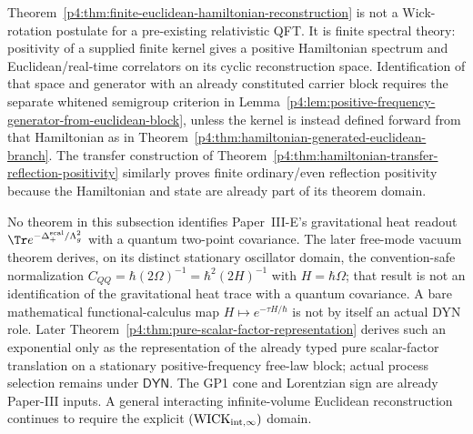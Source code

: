 \documentclass[12pt,a4paper]{article}
\begin{document}
\begin{remark}
\label{p4:rem:euclidean-hamiltonian-noncircular}
\leavevmode\par\noindent
Theorem~\ref{p4:thm:finite-euclidean-hamiltonian-reconstruction} is not a
Wick-rotation postulate for a pre-existing relativistic QFT.  It is finite
spectral theory: positivity of a supplied finite kernel gives a positive
Hamiltonian spectrum and Euclidean/real-time correlators on its cyclic
reconstruction space.  Identification of that space and generator with an
already constituted carrier block requires the separate whitened semigroup
criterion in
Lemma~\ref{p4:lem:positive-frequency-generator-from-euclidean-block}, unless
the kernel is instead defined forward from that Hamiltonian as in
Theorem~\ref{p4:thm:hamiltonian-generated-euclidean-branch}.  The transfer
construction of
Theorem~\ref{p4:thm:hamiltonian-transfer-reflection-positivity} similarly
proves finite ordinary/even reflection positivity because the Hamiltonian and
state are already part of its theorem domain.

No theorem in this subsection identifies Paper~III-E's gravitational heat
readout
\(\Tr e^{-\Delta_+^{\rm scal}/\Lambda_g^2}\) with a quantum two-point
covariance.  The later free-mode vacuum theorem derives, on its distinct
stationary oscillator domain, the convention-safe normalization
\(C_{QQ}=\hbar(2\Omega)^{-1}=\hbar^2(2H)^{-1}\) with \(H=\hbar\Omega\);
that result is not an identification of the gravitational heat trace with a
quantum covariance.  A bare mathematical functional-calculus map
\(H\mapsto e^{-\tau H/\hbar}\) is not by itself an actual DYN role.  Later
Theorem~\ref{p4:thm:pure-scalar-factor-representation} derives such an
exponential only as the representation of the already typed pure scalar-factor
translation on a stationary positive-frequency free-law block; actual process
selection remains under \(\mathsf{DYN}\).  The GP1 cone and Lorentzian sign are
already Paper-III inputs.  A general interacting
infinite-volume Euclidean reconstruction continues to require the explicit
\(({\rm WICK}_{\rm int,\infty})\) domain.
\end{remark}
\end{document}
